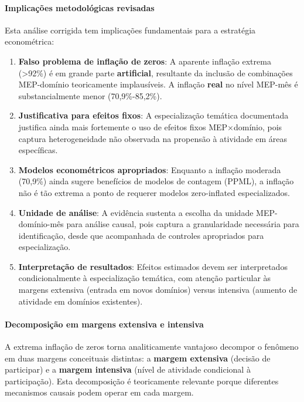 \paragraph{Implicações metodológicas revisadas}

Esta análise corrigida tem implicações fundamentais para a estratégia econométrica:

\begin{enumerate}
    \item \textbf{Falso problema de inflação de zeros}: A aparente inflação extrema (>92\%) é em grande parte \textbf{artificial}, resultante da inclusão de combinações MEP-domínio teoricamente implausíveis. A inflação \textbf{real} no nível MEP-mês é substancialmente menor (70,9\%-85,2\%).
    
    \item \textbf{Justificativa para efeitos fixos}: A especialização temática documentada justifica ainda mais fortemente o uso de efeitos fixos MEP×domínio, pois captura heterogeneidade não observada na propensão à atividade em áreas específicas.
    
    \item \textbf{Modelos econométricos apropriados}: Enquanto a inflação moderada (70,9\%) ainda sugere benefícios de modelos de contagem (PPML), a inflação não é tão extrema a ponto de requerer modelos zero-inflated especializados.
    
    \item \textbf{Unidade de análise}: A evidência sustenta a escolha da unidade MEP-domínio-mês para análise causal, pois captura a granularidade necessária para identificação, desde que acompanhada de controles apropriados para especialização.
    
    \item \textbf{Interpretação de resultados}: Efeitos estimados devem ser interpretados condicionalmente à especialização temática, com atenção particular às margens extensiva (entrada em novos domínios) versus intensiva (aumento de atividade em domínios existentes).
\end{enumerate}

\paragraph{Decomposição em margens extensiva e intensiva}

A extrema inflação de zeros torna analiticamente vantajoso decompor o fenômeno em duas margens conceituais distintas: a \textbf{margem extensiva} (decisão de participar) e a \textbf{margem intensiva} (nível de atividade condicional à participação). Esta decomposição é teoricamente relevante porque diferentes mecanismos causais podem operar em cada margem.

